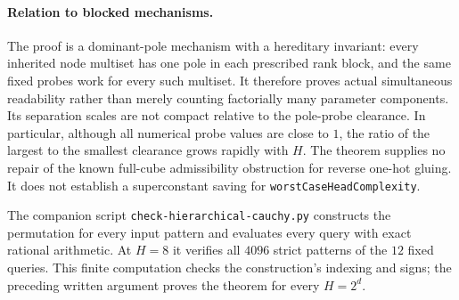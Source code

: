 \documentclass[11pt]{article}
\begin{document}
\paragraph{Relation to blocked mechanisms.}
The proof is a dominant-pole mechanism with a hereditary invariant:
every inherited node multiset has one pole in each prescribed rank
block, and the same fixed probes work for every such multiset. It
therefore proves actual simultaneous readability rather than merely
counting factorially many parameter components. Its separation scales
are not compact relative to the pole-probe clearance. In particular,
although all numerical probe values are close to $1$, the ratio of
the largest to the smallest clearance grows rapidly with $H$.
The theorem supplies no repair of the known full-cube admissibility
obstruction for reverse one-hot gluing. It does not establish a
superconstant saving for \texttt{worstCaseHeadComplexity}.

The companion script \texttt{check-hierarchical-cauchy.py} constructs
the permutation for every input pattern and evaluates every query
with exact rational arithmetic. At $H=8$ it verifies all $4096$
strict patterns of the $12$ fixed queries. This finite computation
checks the construction's indexing and signs; the preceding written
argument proves the theorem for every $H=2^d$.
\end{document}
